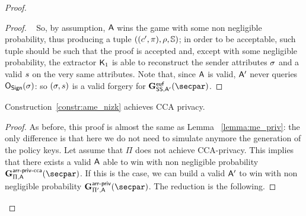 \begin{theorem}
\begin{proof}
\begin{lemma}
\begin{proof}
                ~\newline\newline
                So, by assumption, $\mathsf{A}$ wins the game with some non negligible probability, thus producing a tuple $((c', \pi), \rho, \mathbb{S})$; in order to be acceptable, such tuple should be such that the proof is accepted and, except with some negligible probability, the extractor $\mathsf{K}_1$ is able to reconstruct the sender attributes $\sigma$ and a valid $s$ on the very same attributes.
                Note that, since $\mathsf{A}$ is valid, $\mathsf{A}'$ never queries $\mathsf{O}_{\mathsf{Sign}}(\sigma)$: so $(\sigma, s)$ is a valid forgery for $\Sigeufgame_{\sig, \adversary'}(\secpar)$.
            \end{proof}
        \end{lemma}

        \begin{lemma}\label{lemma:ame_priv}
            Construction~\ref{constr:ame_nizk} achieves CCA privacy.
            \begin{proof}
                As before, this proof is almost the same as Lemma ~\ref{lemma:me_priv}: the only difference is that here we do not need to simulate anymore the generation of the policy keys.
                Let assume that $\Pi$ does not achieve CCA-privacy. This implies that there exists a valid $\mathsf{A}$ able to win with non negligible probability $\NISHmatchgamecca{\arranged}_{\Pi, \adversary}(\secpar)$. If this is the case, we can build a valid $\mathsf{A}'$ to win with non negligible probability $\NISHmatchgame{\arranged}_{\Pi', \adversary}(\secpar)$. The reduction is the following.


\end{proof}
\end{lemma}
\end{proof}
\end{theorem}
